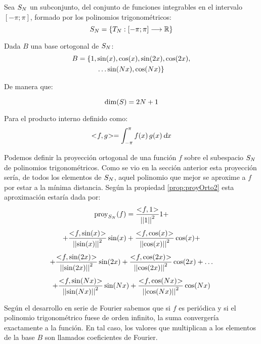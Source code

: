 Sea $S_N$ un subconjunto, del conjunto de funciones integrables en el intervalo $[-\pi;\pi]$, formado por los polinomios trigonométricos:
\begin{equation*}
    S_N = { \left\{ {T_N: \left[-\pi;\pi\right] \longrightarrow \mathbb{R}} \right\} }
\end{equation*}

Dada $B$ una base ortogonal de $S_N$:
\begin{multline*}
    B = \{ 1 , \sin(x) , \cos(x) , \sin(2x) , \cos(2x) ,
    \\
    \dots \sin(N x) , \cos(N x) \}
\end{multline*}

De manera que:

\begin{mdframed}[style=PropertyFrame]
    \begin{prop}
    \end{prop}
    \begin{equation*}
        \operatorname{dim}(S) = 2 N + 1
    \end{equation*}
\end{mdframed}

Para el producto interno definido como:
\begin{equation*}
    <\hspace{-0.8mm}f,g\hspace{-0.8mm}> = \int_{-\pi}^\pi f(x) \, g(x) \, \textsl{d} x
\end{equation*}

Podemos definir la proyección ortogonal de una función $f$ sobre el subespacio $S_N$ de polinomios trigonométricos.
Como se vio en la sección anterior esta proyección sería, de todos los elementos de $S_N$, aquel polinomio que mejor se aproxime a $f$ por estar a la mínima distancia.
Según la propiedad \ref{prop:proyOrto2} esta aproximación estaría dada por:
\begin{multline*}
    \proy_{S_\Nth}(f) = \frac{\intProd{f}{1}}{\nnorm{1}^2} 1 +
    \\[1ex]
    + \frac{\intProd{f}{\sin(x)}}{\nnorm{\sin(x)}^2} \sin(x) + \frac{\intProd{f}{\cos(x)}}{\nnorm{\cos(x)}^2} \cos(x) +
    \\[1ex]
    + \frac{\intProd{f}{\sin(2x)}}{\nnorm{\sin(2x)}^2} \sin(2x) + \frac{\intProd{f}{\cos(2x)}}{\nnorm{\cos(2x)}^2} \cos(2x) + \dots
    \\[1ex]
    + \frac{\intProd{f}{\sin(\Nth x)}}{\nnorm{\sin(\Nth x)}^2} \sin(\Nth x) + \frac{\intProd{f}{\cos(\Nth x)}}{\nnorm{\cos(\Nth x)}^2} \cos(\Nth x)
\end{multline*}

Según el desarrollo en serie de Fourier sabemos que si $f$ es periódica y si el polinomio trigonométrico fuese de orden infinito, la suma convergería exactamente a la función.
En tal caso, los valores que multiplican a los elementos de la base $B$ son llamados coeficientes de Fourier.